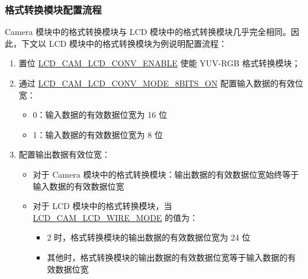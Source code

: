 \documentclass[main\_\_CN.tex]{subfiles}
\begin{document}
\subsubsection{格式转换模块配置流程}

Camera 模块中的格式转换模块与 LCD 模块中的格式转换模块几乎完全相同。因此，下文以 LCD 模块中的格式转换模块为例说明配置流程：

\begin{enumerate}
    \item 置位 \hyperref[fielddesc:LCDCAMLCDCONVENABLE]{LCD\_CAM\_LCD\_CONV\_ENABLE} 使能 YUV-RGB 格式转换模块；
    \item 通过 \hyperref[fielddesc:LCDCAMLCDCONVMODE8BITSON]{LCD\_CAM\_LCD\_CONV\_MODE\_8BITS\_ON} 配置输入数据的有效位宽：
    \begin{itemize}
        \item 0：输入数据的有效数据位宽为 16 位
        \item 1：输入数据的有效数据位宽为 8 位

    \end{itemize}
    \item 配置输出数据有效位宽：
    \begin{itemize}
        \item 对于 Camera 模块中的格式转换模块：输出数据的有效数据位宽始终等于输入数据的有效数据位宽
        \item 对于 LCD 模块中的格式转换模块，当 \hyperref[fielddesc:LCDCAMLCDWIREMODE]{LCD\_CAM\_LCD\_WIRE\_MODE} 的值为：
        \begin{itemize}
            \item 2 时，格式转换模块的输出数据的有效数据位宽为 24 位
            \item 其他时，格式转换模块的输出数据的有效数据位宽等于输入数据的有效数据位宽


\end{itemize}
\end{itemize}
\end{enumerate}
\end{document}
